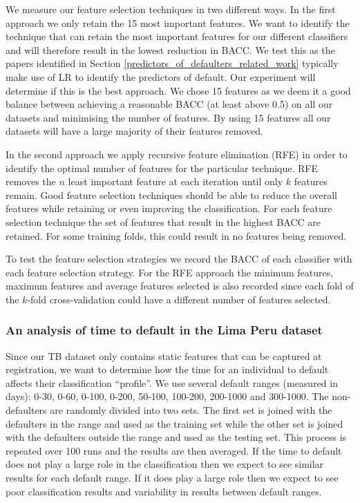 \documentclass{sig-alternate-05-2015}
\begin{document}
	We measure our feature selection techniques in two different ways. In the first approach we only retain the 15 most important features.  We want to identify the technique that can retain the most important features for our different classifiers and will therefore result in the lowest reduction in BACC. We test this as the papers identified in Section \ref{predictors_of_defaulters_related_work} typically make use of LR to identify the predictors of default. Our experiment will determine if this is the best approach. We chose 15 features as we deem it a good balance between achieving a reasonable BACC (at least above 0.5) on all our datasets and minimising the number of features. By using 15 features all our datasets will have a large majority of their features removed.
	
	In the second approach we apply recursive feature elimination (RFE) in order to identify the optimal number of features for the particular technique. RFE removes the $n$ least important feature at each iteration until only $k$ features remain. Good feature selection techniques should be able to reduce the overall features while retaining or even improving the classification. For each feature selection technique the set of features that result in the highest BACC are retained. For some training folds, this could result in no features being removed. 
	
	To test the feature selection strategies we record the BACC of each classifier with each feature selection strategy. For the RFE approach the minimum features, maximum features and average features selected is also recorded since each fold of the $k$-fold cross-validation could have a different number of features selected.
	
	\subsubsection{An analysis of time to default in the Lima Peru dataset}
	Since our TB dataset only contains static features that can be captured at registration, we want to determine how the time for an individual to default affects their classification ``profile''. We use several default ranges (measured in days): 0-30, 0-60, 0-100, 0-200, 50-100, 100-200, 200-1000 and 300-1000. The non-defaulters are randomly divided into two sets. The first set is joined with the defaulters in the range and used as the training set while the other set is joined with the defaulters outside the range and used as the testing set. This process is repeated over 100 runs and the results are then averaged. If the time to default does not play a large role in the classification then we expect to see similar results for each default range. If it does play a large role then we expect to see poor classification results and variability in results between default ranges.
	
\end{document}
